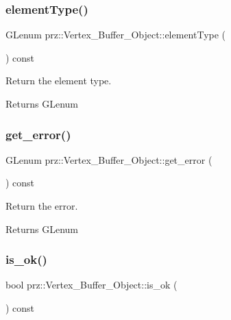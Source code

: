 \subsubsection{\texorpdfstring{elementType()}{elementType()}}
{\footnotesize\ttfamily G\+Lenum prz\+::\+Vertex\+\_\+\+Buffer\+\_\+\+Object\+::element\+Type (\begin{DoxyParamCaption}{ }\end{DoxyParamCaption}) const\hspace{0.3cm}{\ttfamily [inline]}}



Return the element type. 

\begin{DoxyReturn}{Returns}
G\+Lenum 
\end{DoxyReturn}
\mbox{\label{classprz_1_1_vertex___buffer___object_a7f588b2a07a856c1edde321ee47ee100}} 
\subsubsection{\texorpdfstring{get\_error()}{get\_error()}}
{\footnotesize\ttfamily G\+Lenum prz\+::\+Vertex\+\_\+\+Buffer\+\_\+\+Object\+::get\+\_\+error (\begin{DoxyParamCaption}{ }\end{DoxyParamCaption}) const\hspace{0.3cm}{\ttfamily [inline]}}



Return the error. 

\begin{DoxyReturn}{Returns}
G\+Lenum 
\end{DoxyReturn}
\mbox{\label{classprz_1_1_vertex___buffer___object_a3aa6dbac656b3ff18972032fc9522aab}} 
\subsubsection{\texorpdfstring{is\_ok()}{is\_ok()}}
{\footnotesize\ttfamily bool prz\+::\+Vertex\+\_\+\+Buffer\+\_\+\+Object\+::is\+\_\+ok (\begin{DoxyParamCaption}{ }\end{DoxyParamCaption}) const\hspace{0.3cm}{\ttfamily [inline]}}



